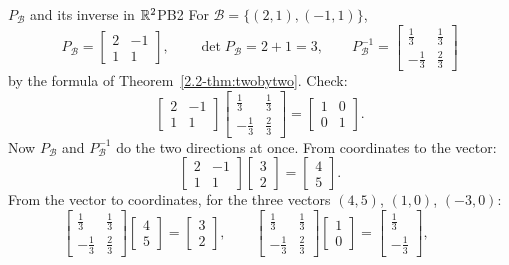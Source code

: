\documentclass[11pt]{article}
\begin{document}
\begin{exmp}{$P_{\mathcal{B}}$ and its inverse in $\mathbb{R}^2$}{PB2}
For $\mathcal{B}=\{(2,1),(-1,1)\}$,
\[
P_{\mathcal{B}}=\begin{bmatrix}2&-1\\1&1\end{bmatrix},\qquad \det P_{\mathcal{B}}=2+1=3,\qquad P_{\mathcal{B}}^{-1}=\begin{bmatrix}\tfrac13&\tfrac13\\-\tfrac13&\tfrac23\end{bmatrix}
\]
by the formula of Theorem~\ref{2.2-thm:twobytwo}. Check:
\[
\begin{bmatrix}2&-1\\1&1\end{bmatrix}\begin{bmatrix}\tfrac13&\tfrac13\\-\tfrac13&\tfrac23\end{bmatrix}=\begin{bmatrix}1&0\\0&1\end{bmatrix}.
\]
Now $P_{\mathcal{B}}$ and $P_{\mathcal{B}}^{-1}$ do the two directions at once. From coordinates to the vector:
\[
\begin{bmatrix}2&-1\\1&1\end{bmatrix}\begin{bmatrix}3\\2\end{bmatrix}=\begin{bmatrix}4\\5\end{bmatrix}.
\]
From the vector to coordinates, for the three vectors $(4,5)$, $(1,0)$, $(-3,0)$:
\[
\begin{bmatrix}\tfrac13&\tfrac13\\-\tfrac13&\tfrac23\end{bmatrix}\begin{bmatrix}4\\5\end{bmatrix}=\begin{bmatrix}3\\2\end{bmatrix},\qquad
\begin{bmatrix}\tfrac13&\tfrac13\\-\tfrac13&\tfrac23\end{bmatrix}\begin{bmatrix}1\\0\end{bmatrix}=\begin{bmatrix}\tfrac13\\-\tfrac13\end{bmatrix},\qquad
\]
\end{exmp}
\end{document}
